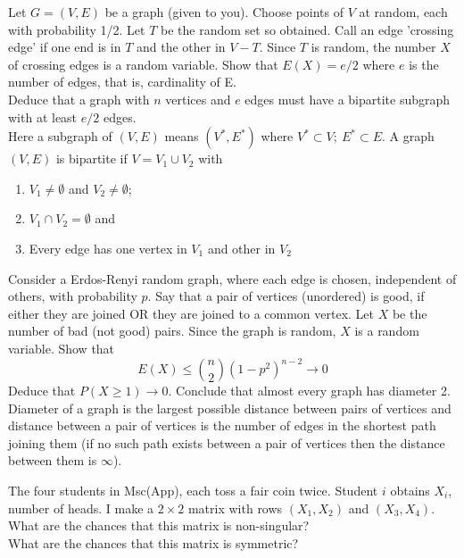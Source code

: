 \documentclass[12pt]{article}
\newenvironment{question}[2][Question]{\begin{trivlist}
\item[\hskip \labelsep {\bfseries #1}\hskip \labelsep {\bfseries #2.}]}{\end{trivlist}}
\begin{document}
\begin{question}{32}
Let $G = (V,E)$ be a graph (given to you). Choose points of $V$ at random, each with probability 1/2. Let $T$ be the random set so obtained. Call an edge 'crossing edge' if one end is in $T$ and the other in $V-T$. Since $T$ is random, the number $X$ of crossing edges is a random variable. Show that $E(X) = e/2$ where $e$ is the number of edges, that is, cardinality of E.\\
Deduce that a graph with $n$ vertices and $e$ edges must have a bipartite subgraph with at least $e/2$ edges.\\
Here a subgraph of $(V,E)$ means $(V^*,E^*)$ where $V^* \subset V; \: E^* \subset E$. A graph $(V,E)$ is bipartite if $V=V_1 \cup V_2$ with 
\begin{enumerate}
\item $V_1 \neq \emptyset$ and $V_2 \neq \emptyset;$
\item $V_1 \cap V_2 = \emptyset$ and 
\item Every edge has one vertex in $V_1$ and other in $V_2$
\end{enumerate}
\end{question}

\begin{question}{33}
Consider a Erdos-Renyi random graph, where each edge is chosen, independent of others, with probability $p$. Say that a pair of vertices (unordered) is good, if either they are joined OR they are joined to a common vertex. Let $X$ be the number of bad (not good) pairs. Since the graph is random, $X$ is a random variable. Show that
\[
E(X) \leq {n \choose 2} {(1 - p^2)}^{n-2} \to 0
\]
Deduce that $P(X \geq 1) \to 0$. Conclude that almost every graph has diameter 2.\\
Diameter of a graph is the largest possible distance between pairs of vertices and distance between a pair of vertices is the number of edges in the shortest path joining them (if no such path exists between a pair of vertices then the distance between them is $\infty$).
\end{question}

\begin{question}{34}
The four students in Msc(App), each toss a fair coin twice. Student $i$ obtains $X_i$, number of heads. I make a $2 \times 2$ matrix with rows $(X_1,X_2)$ and $(X_3,X_4)$. What are the chances that this matrix is non-singular?\\What are the chances that this matrix is symmetric?
\end{question}
\end{document}
